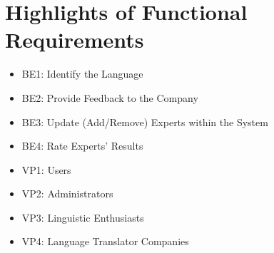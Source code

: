 \section{Highlights of Functional Requirements}
\label{sec:functional_requirements}


\begin{itemize}
	\item BE1: Identify the Language
	\item BE2: Provide Feedback to the Company
	\item BE3: Update (Add/Remove) Experts within the System
	\item BE4: Rate Experts' Results
\end{itemize}

\begin{itemize}
	\item VP1: Users
	\item VP2: Administrators
	\item VP3: Linguistic Enthusiasts
	\item VP4: Language Translator Companies
\end{itemize}




